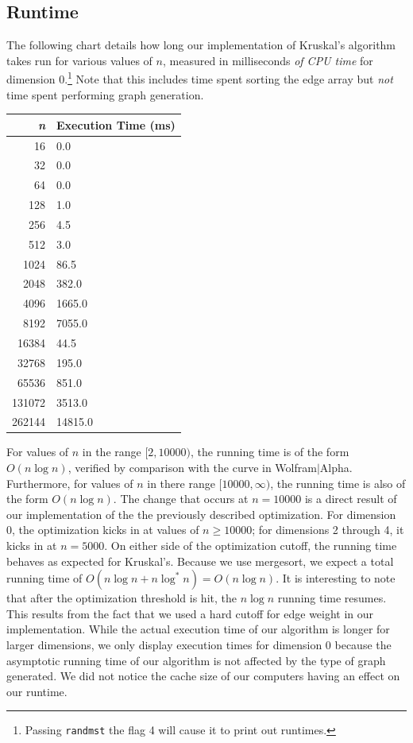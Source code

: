 \documentclass[solution, letterpaper]{cs121}
\begin{document}
\subsection*{Runtime}
\hspace{5mm} The following chart details how long our implementation of Kruskal's algorithm takes run for various values of $n$, measured in milliseconds \emph{of CPU time} for dimension 0.\footnote{Passing {\tt randmst} the flag 4 will cause it to print out runtimes.} Note that this includes time spent sorting the edge array but \emph{not} time spent performing graph generation.

\begin{center}
\begin{tabular}{ | r | l |}
\hline
\bf{\itshape{n}} & \bf{Execution Time (ms) } \\
\hline
16 & 0.0 \\
\hline
32 & 0.0 \\
\hline
64 & 0.0 \\
\hline
128 & 1.0 \\
\hline
256 & 4.5 \\
\hline
512 & 3.0 \\
\hline
1024 & 86.5 \\
\hline
2048 & 382.0 \\
\hline
4096 & 1665.0 \\
\hline
8192 & 7055.0 \\
\hline
16384 & 44.5 \\
\hline
32768 & 195.0 \\
\hline
65536 & 851.0 \\
\hline
131072 & 3513.0 \\
\hline
262144 & 14815.0 \\
\hline
\end{tabular}
\end{center}

For values of $n$ in the range $[2, 10000)$, the running time is of the form $O(n\log n)$, verified by comparison with the curve in Wolfram$|$Alpha. Furthermore, for values of $n$ in there range $[10000, \infty)$, the running time is also of the form $O(n\log n)$. The change that occurs at $n=10000$ is a direct result of our implementation of the the previously described optimization. For dimension 0, the optimization kicks in at values of $n \geq 10000$; for dimensions 2 through 4, it kicks in at $n=5000$. On either side of the optimization cutoff, the running time behaves as expected for Kruskal's. Because we use mergesort, we expect a total running time of $O(n \log n + n \log^*n) = O(n \log n)$. It is interesting to note that after the optimization threshold is hit, the $n\log n$ running time resumes. This results from the fact that we used a hard cutoff for edge weight in our implementation. While the actual execution time of our algorithm is longer for larger dimensions, we only display execution times for dimension 0 because the asymptotic running time of our algorithm is not affected by the type of graph generated. We did not notice the cache size of our computers having an effect on our runtime.
\end{document}
